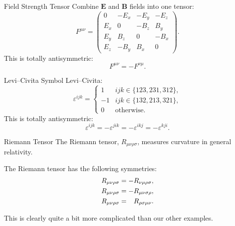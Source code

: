 \documentclass{beamer}
\newcommand{\define}[1]{\alert{#1}}
\newcommand{\vv}[1]{\symbf{#1}}
\begin{document}
    \begin{frame}{Field Strength Tensor}
        Combine \(\vv{E}\) and \(\vv{B}\) fields into one tensor:
        \begin{equation}
            F^{\mu\nu} =
            \begin{pmatrix}
                0 & -E_x & -E_y & -E_z\\
                E_x & 0 & -B_z & B_y\\
                E_y & B_z & 0 & -B_x\\
                E_z & -B_y & B_x & 0
            \end{pmatrix}
            .
            \tag{\(c = 1\)}
        \end{equation}
        This is \define{totally antisymmetric}:
        \begin{equation*}
            F^{\mu\nu} = -F^{\nu\mu}.
        \end{equation*}
    \end{frame}
    
    \begin{frame}{Levi--Civita Symbol}
        Levi--Civita:
        \begin{equation*}
            \varepsilon^{ijk} =
            \begin{cases}
                1 & ijk \in \{123, 231, 312\},\\
                -1 & ijk \in \{132, 213, 321\},\\
                0 & \text{otherwise}.
            \end{cases}
        \end{equation*}
        This is \define{totally antisymmetric}:
        \begin{equation*}
            \varepsilon^{ijk} = -\varepsilon^{jik} = -\varepsilon^{ikj} = -\varepsilon^{kji}.
        \end{equation*}
    \end{frame}
    
    \begin{frame}{Riemann Tensor}
        The Riemann tensor, \(R_{\mu\nu\rho\sigma}\), measures curvature in general relativity.
        
        \pause
        The Riemann tensor has the following symmetries:
        \begin{align*}
            R_{\mu\nu\rho\sigma} &= - R_{\nu\mu\rho\sigma},\\
            R_{\mu\nu\rho\sigma} &= - R_{\mu\nu\sigma\rho},\\
            R_{\mu\nu\rho\sigma} &= \hphantom{-} R_{\rho\sigma\mu\nu}.
        \end{align*}
        
        This is clearly quite a bit more complicated than our other examples.
    \end{frame}
    
\end{document}
